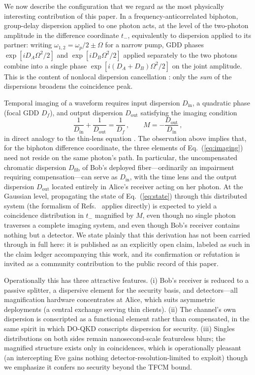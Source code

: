 \documentclass[11pt]{article}
\begin{document}
We now describe the configuration that we regard as the most physically interesting contribution of this paper. In a frequency-anticorrelated biphoton, group-delay dispersion applied to one photon acts, at the level of the two-photon amplitude in the difference coordinate $t_-$, equivalently to dispersion applied to its partner: writing $\omega_{1,2} = \omega_p/2 \pm \Omega$ for a narrow pump, GDD phases $\exp[i D_A \Omega^2/2]$ and $\exp[i D_B \Omega^2/2]$ applied separately to the two photons combine into a single phase $\exp[i (D_A + D_B)\Omega^2/2]$ on the joint amplitude. This is the content of nonlocal dispersion cancellation \cite{Franson1992,Baek2009,MacLean2018}: only the \emph{sum} of the dispersions broadens the coincidence peak.

Temporal imaging of a waveform requires input dispersion $D_{\mathrm{in}}$, a quadratic phase (focal GDD $D_f$), and output dispersion $D_{\mathrm{out}}$ satisfying the imaging condition
\begin{equation}
\frac{1}{D_{\mathrm{in}}} + \frac{1}{D_{\mathrm{out}}} = \frac{1}{D_f}\,, \qquad M = -\frac{D_{\mathrm{out}}}{D_{\mathrm{in}}}\,,
\label{eq:imaging}
\end{equation}
in direct analogy to the thin-lens equation \cite{KolnerNazarathy1989,Kolner1994}. The observation above implies that, for the biphoton difference coordinate, the three elements of Eq.~(\ref{eq:imaging}) need not reside on the same photon's path. In particular, the uncompensated chromatic dispersion $D_{\mathrm{fib}}$ of Bob's deployed fiber---ordinarily an impairment requiring compensation---can serve as $D_{\mathrm{in}}$, with the time lens and the output dispersion $D_{\mathrm{out}}$ located entirely in Alice's receiver acting on her photon. At the Gaussian level, propagating the state of Eq.~(\ref{eq:state}) through this distributed system (the formalism of Refs.~\cite{TsangPsaltis2006,Patera2017} applies directly) is expected to yield a coincidence distribution in $t_-$ magnified by $M$, even though no single photon traverses a complete imaging system, and even though Bob's receiver contains nothing but a detector. We state plainly that this derivation has not been carried through in full here: it is published as an explicitly open claim, labeled as such in the claim ledger accompanying this work, and its confirmation or refutation is invited as a community contribution to the public record of this paper.

Operationally this has three attractive features. (i) Bob's receiver is reduced to a passive splitter, a dispersive element for the security basis, and detectors---all magnification hardware concentrates at Alice, which suits asymmetric deployments (a central exchange serving thin clients). (ii) The channel's own dispersion is conscripted as a functional element rather than compensated, in the same spirit in which DO-QKD conscripts dispersion for security. (iii) Singles distributions on both sides remain nanosecond-scale featureless blurs; the magnified structure exists only in coincidences, which is operationally pleasant (an intercepting Eve gains nothing detector-resolution-limited to exploit) though we emphasize it confers no security beyond the TFCM bound.
\end{document}
